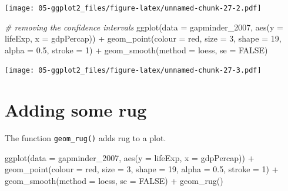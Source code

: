 \documentclass[
]{book}
\newenvironment{Shaded}{\begin{snugshade}}{\end{snugshade}}
\newcommand{\AttributeTok}[1]{\textcolor[rgb]{0.77,0.63,0.00}{#1}}
\newcommand{\CommentTok}[1]{\textcolor[rgb]{0.56,0.35,0.01}{\textit{#1}}}
\newcommand{\ConstantTok}[1]{\textcolor[rgb]{0.00,0.00,0.00}{#1}}
\newcommand{\DecValTok}[1]{\textcolor[rgb]{0.00,0.00,0.81}{#1}}
\newcommand{\FloatTok}[1]{\textcolor[rgb]{0.00,0.00,0.81}{#1}}
\newcommand{\FunctionTok}[1]{\textcolor[rgb]{0.00,0.00,0.00}{#1}}
\newcommand{\NormalTok}[1]{#1}
\newcommand{\SpecialCharTok}[1]{\textcolor[rgb]{0.00,0.00,0.00}{#1}}
\newcommand{\StringTok}[1]{\textcolor[rgb]{0.31,0.60,0.02}{#1}}
\begin{document}
\texttt{[image: 05-ggplot2\_files/figure-latex/unnamed-chunk-27-2.pdf]}

\begin{Shaded}
\begin{Highlighting}[]
\CommentTok{\# removing the confidence intervals}
\FunctionTok{ggplot}\NormalTok{(}\AttributeTok{data =}\NormalTok{ gapminder\_2007, }\FunctionTok{aes}\NormalTok{(}\AttributeTok{y =}\NormalTok{ lifeExp, }\AttributeTok{x =}\NormalTok{ gdpPercap)) }\SpecialCharTok{+} 
  \FunctionTok{geom\_point}\NormalTok{(}\AttributeTok{colour =} \StringTok{\textquotesingle{}red\textquotesingle{}}\NormalTok{, }\AttributeTok{size =} \DecValTok{3}\NormalTok{, }\AttributeTok{shape =} \DecValTok{19}\NormalTok{, }\AttributeTok{alpha =} \FloatTok{0.5}\NormalTok{, }\AttributeTok{stroke =} \DecValTok{1}\NormalTok{) }\SpecialCharTok{+}
  \FunctionTok{geom\_smooth}\NormalTok{(}\AttributeTok{method =}\NormalTok{ loess, }\AttributeTok{se =} \ConstantTok{FALSE}\NormalTok{)}
\end{Highlighting}
\end{Shaded}

\texttt{[image: 05-ggplot2\_files/figure-latex/unnamed-chunk-27-3.pdf]}

\hypertarget{adding-some-rug}{%
\section{Adding some rug}\label{adding-some-rug}}

The function \texttt{geom\_rug()} adds rug to a plot.

\begin{Shaded}
\begin{Highlighting}[]
\FunctionTok{ggplot}\NormalTok{(}\AttributeTok{data =}\NormalTok{ gapminder\_2007, }\FunctionTok{aes}\NormalTok{(}\AttributeTok{y =}\NormalTok{ lifeExp, }\AttributeTok{x =}\NormalTok{ gdpPercap)) }\SpecialCharTok{+} 
  \FunctionTok{geom\_point}\NormalTok{(}\AttributeTok{colour =} \StringTok{\textquotesingle{}red\textquotesingle{}}\NormalTok{, }\AttributeTok{size =} \DecValTok{3}\NormalTok{, }\AttributeTok{shape =} \DecValTok{19}\NormalTok{, }\AttributeTok{alpha =} \FloatTok{0.5}\NormalTok{, }\AttributeTok{stroke =} \DecValTok{1}\NormalTok{) }\SpecialCharTok{+}
  \FunctionTok{geom\_smooth}\NormalTok{(}\AttributeTok{method =}\NormalTok{ loess, }\AttributeTok{se =} \ConstantTok{FALSE}\NormalTok{) }\SpecialCharTok{+}
  \FunctionTok{geom\_rug}\NormalTok{()}
\end{Highlighting}
\end{Shaded}
\end{document}
